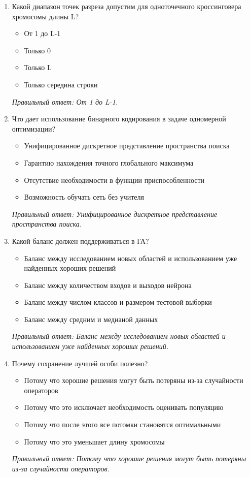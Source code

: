 \begin{enumerate}[label=\textbf{\arabic*.}, leftmargin=0pt, itemsep=1.2em]
\item Какой диапазон точек разреза допустим для одноточечного кроссинговера хромосомы длины L?
\begin{itemize}[label=$\square$, leftmargin=1.5cm, itemsep=0.2em, topsep=0.3em]
\item От 1 до L-1
\item Только 0
\item Только L
\item Только середина строки
\end{itemize}
{\small\textit{Правильный ответ: От 1 до L-1.}}

\item Что дает использование бинарного кодирования в задаче одномерной оптимизации?
\begin{itemize}[label=$\square$, leftmargin=1.5cm, itemsep=0.2em, topsep=0.3em]
\item Унифицированное дискретное представление пространства поиска
\item Гарантию нахождения точного глобального максимума
\item Отсутствие необходимости в функции приспособленности
\item Возможность обучать сеть без учителя
\end{itemize}
{\small\textit{Правильный ответ: Унифицированное дискретное представление пространства поиска.}}

\item Какой баланс должен поддерживаться в ГА?
\begin{itemize}[label=$\square$, leftmargin=1.5cm, itemsep=0.2em, topsep=0.3em]
\item Баланс между исследованием новых областей и использованием уже найденных хороших решений
\item Баланс между количеством входов и выходов нейрона
\item Баланс между числом классов и размером тестовой выборки
\item Баланс между средним и медианой данных
\end{itemize}
{\small\textit{Правильный ответ: Баланс между исследованием новых областей и использованием уже найденных хороших решений.}}

\item Почему сохранение лучшей особи полезно?
\begin{itemize}[label=$\square$, leftmargin=1.5cm, itemsep=0.2em, topsep=0.3em]
\item Потому что хорошие решения могут быть потеряны из-за случайности операторов
\item Потому что это исключает необходимость оценивать популяцию
\item Потому что после этого все потомки становятся оптимальными
\item Потому что это уменьшает длину хромосомы
\end{itemize}
{\small\textit{Правильный ответ: Потому что хорошие решения могут быть потеряны из-за случайности операторов.}}


\end{enumerate}
